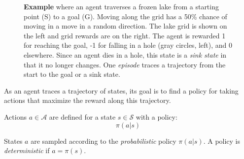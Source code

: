 \documentclass{article}
\begin{document}
\begin{figure}
    \centering
    \caption{\textbf{Example} where an agent traverses a frozen lake from a starting point (S) to a goal (G). Moving along the grid has a 50\% chance of moving in a move in a random direction. The lake grid is shown on the left and grid rewards are on the right. The agent is rewarded 1 for reaching the goal, -1 for falling in a hole (gray circles, left), and 0 elsewhere. Since an agent dies in a hole, this state is a \textit{sink state} in that it no longer changes. One \textit{episode} traces a trajectory from the start to the goal or a sink state.}
    \label{fig:eg_frozen_lake}
\end{figure}

As an agent traces a trajectory of states, its goal is to find a policy for taking actions that maximize the reward along this trajectory.

\begin{defn}[Policy]
Actions $a\in \mathcal{A}$ are defined for a state $s\in \mathcal{S}$ with a policy:
\[
\pi(a|s)
\]
\end{defn}
States $a$ are sampled according to the \textit{probabilistic} policy $\pi(a|s)$. A policy is \textit{deterministic} if $a = \pi(s)$.
\end{document}
